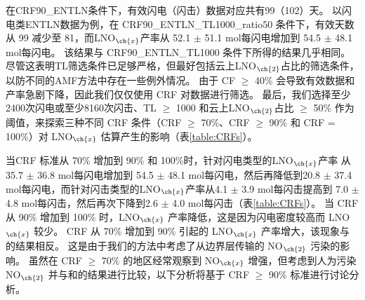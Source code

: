 在CRF90\_ENTLN条件下，有效闪电（闪击）数据对应共有99（102）天。
以闪电类ENTLN数据为例，在 CRF90\_ENTLN\_TL1000\_ratio50 条件下，有效天数从 99 减少至 81，而LNO$_{\ch{x}}$产率从 52.1 $\pm$ 51.1 mol每闪电增加到 54.5 $\pm$ 48.1 mol每闪电。
该结果与 CRF90\_ENTLN\_TL1000 条件下所得的结果几乎相同。
尽管这表明TL筛选条件已足够严格，但最好包括云上LNO$_{\ch{2}}$占比的筛选条件，以防不同的AMF方法中存在一些例外情况。
由于 CF $\geq$ 40\% 会导致有效数据和产率急剧下降，因此我们仅仅使用 CRF 对数据进行筛选。
最后，我们选择至少2400次闪电或至少8160次闪击、TL $\geq$ 1000 和云上LNO$_{\ch{2}}$占比 $\geq$ 50\% 作为阈值，来探索三种不同 CRF 条件（CRF $\geq$ 70\%、CRF $\geq$ 90\% 和 CRF = 100\%）对 LNO$_{\ch{x}}$ 估算产生的影响（表\ref{table:CRFs}）。

当CRF 标准从 70\% 增加到 90\% 和 100\%时，针对闪电类型的LNO$_{\ch{x}}$产率 从35.7 $\pm$ 36.8 mol每闪电增加到 54.5 $\pm$ 48.1 mol每闪电，然后再降低到20.8 $\pm$ 37.4 mol每闪电，而针对闪击类型的LNO$_{\ch{x}}$产率从4.1 $\pm$ 3.9 mol每闪击提高到 7.0 $\pm$ 4.8 mol每闪击，然后再次下降到2.6 $\pm$ 4.0 mol每闪击（表\ref{table:CRFs}）。
当 CRF 从 90\% 增加到 100\% 时，LNO$_{\ch{x}}$ 产率降低，这是因为闪电密度较高而 LNO$_{\ch{x}}$ 较少。
CRF 从 70\% 增加到 90\% 引起的 LNO$_{\ch{x}}$ 产率增大，该现象与\citet{Pickering.2016}的结果相反。
这是由于我们的方法中考虑了从边界层传输的 NO$_{\ch{2}}$ 污染的影响。
虽然在 CRF $\geq$ 70\% 的地区经常观察到 NO$_{\ch{x}}$ 增强\citep{Pickering.2016}，但考虑到人为污染 NO$_{\ch{2}}$ 并与\citet{Pickering.2016}和\citet{Lapierre.2020}的结果进行比较，以下分析将基于 CRF $\geq$ 90\% 标准进行讨论分析。


